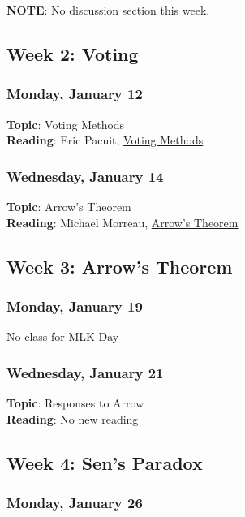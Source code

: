\documentclass[
  letterpaper,
  DIV=11,
  numbers=noendperiod]{scrartcl}
\begin{document}
\textbf{NOTE}: No discussion section this week.

\subsection{Week 2: Voting}\label{week-2-voting}

\subsubsection{Monday, January 12}\label{monday-january-12}

\textbf{Topic}: Voting Methods\\
\textbf{Reading}: Eric Pacuit,
\href{https://plato.stanford.edu/entries/voting-methods/}{Voting
Methods}

\subsubsection{Wednesday, January 14}\label{wednesday-january-14}

\textbf{Topic}: Arrow's Theorem\\
\textbf{Reading}: Michael Morreau,
\href{https://plato.stanford.edu/archives/win2022/entries/arrows-theorem/}{Arrow's
Theorem}

\subsection{Week 3: Arrow's Theorem}\label{week-3-arrows-theorem}

\subsubsection{Monday, January 19}\label{monday-january-19}

No class for MLK Day

\subsubsection{Wednesday, January 21}\label{wednesday-january-21}

\textbf{Topic}: Responses to Arrow\\
\textbf{Reading}: No new reading

\subsection{Week 4: Sen's Paradox}\label{week-4-sens-paradox}

\subsubsection{Monday, January 26}\label{monday-january-26}
\end{document}
